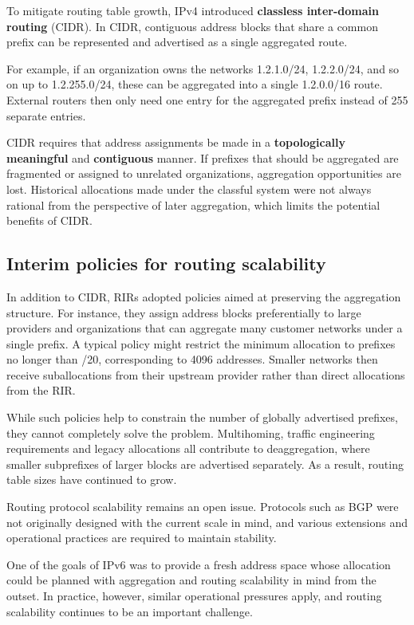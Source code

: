 To mitigate routing table growth, IPv4 introduced \textbf{classless inter-domain routing} (CIDR). In CIDR, contiguous address blocks that share a common prefix can be represented and advertised as a single aggregated route.

For example, if an organization owns the networks 1.2.1.0/24, 1.2.2.0/24, and so on up to 1.2.255.0/24, these can be aggregated into a single 1.2.0.0/16 route. External routers then only need one entry for the aggregated prefix instead of 255 separate entries.

CIDR requires that address assignments be made in a \textbf{topologically meaningful} and \textbf{contiguous} manner. If prefixes that should be aggregated are fragmented or assigned to unrelated organizations, aggregation opportunities are lost. Historical allocations made under the classful system were not always rational from the perspective of later aggregation, which limits the potential benefits of CIDR.

\subsection{Interim policies for routing scalability}

In addition to CIDR, RIRs adopted policies aimed at preserving the aggregation structure. For instance, they assign address blocks preferentially to large providers and organizations that can aggregate many customer networks under a single prefix. A typical policy might restrict the minimum allocation to prefixes no longer than /20, corresponding to 4096 addresses. Smaller networks then receive suballocations from their upstream provider rather than direct allocations from the RIR.

While such policies help to constrain the number of globally advertised prefixes, they cannot completely solve the problem. Multihoming, traffic engineering requirements and legacy allocations all contribute to deaggregation, where smaller subprefixes of larger blocks are advertised separately. As a result, routing table sizes have continued to grow.

Routing protocol scalability remains an open issue. Protocols such as BGP were not originally designed with the current scale in mind, and various extensions and operational practices are required to maintain stability.

One of the goals of IPv6 was to provide a fresh address space whose allocation could be planned with aggregation and routing scalability in mind from the outset. In practice, however, similar operational pressures apply, and routing scalability continues to be an important challenge.

